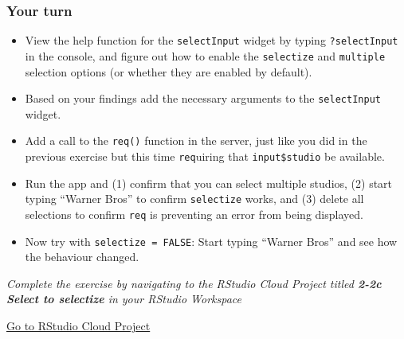 \documentclass[
  letterpaper,
  DIV=11,
  numbers=noendperiod]{scrreprt}
\begin{document}
\hypertarget{your-turn-8}{%
\subsubsection{Your turn}\label{your-turn-8}}

\begin{itemize}
\item
  View the help function for the \texttt{selectInput} widget by typing
  \texttt{?selectInput} in the console, and figure out how to enable the
  \texttt{selectize} and \texttt{multiple} selection options (or whether
  they are enabled by default).
\item
  Based on your findings add the necessary arguments to the
  \texttt{selectInput} widget.
\item
  Add a call to the \texttt{req()} function in the server, just like you
  did in the previous exercise but this time \texttt{req}uiring that
  \texttt{input\$studio} be available.
\item
  Run the app and (1) confirm that you can select multiple studios, (2)
  start typing ``Warner Bros'' to confirm \texttt{selectize} works, and
  (3) delete all selections to confirm \texttt{req} is preventing an
  error from being displayed.
\item
  Now try with \texttt{selectize\ =\ FALSE}: Start typing ``Warner
  Bros'' and see how the behaviour changed.
\end{itemize}

\emph{Complete the exercise by navigating to the RStudio Cloud Project
titled \textbf{2-2c Select to selectize} in your RStudio Workspace}

\href{https://rstudio.cloud/spaces/81721/join?access_code=I4VJaNsKfTqR3Td9hLP7E1nz8\%2FtMg6Xbw9Bgqumv}{
Go to RStudio Cloud Project}
\end{document}
